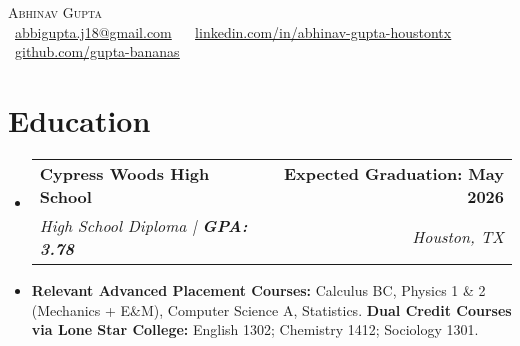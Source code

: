 \documentclass[letterpaper,11pt]{article}
\makeatletter
\newcommand{\resumeItem}[1]{
  \item\small{
    {#1 \vspace{0pt}}
  }
}
\newcommand{\resumeSubheading}[4]{
  \vspace{-2pt}\item
    \begin{tabular*}{1.0\textwidth}[t]{l@{\extracolsep{\fill}}r}
      \textbf{#1} & \textbf{\small #2} \\
      \textit{\small#3} & \textit{\small #4} \\
    \end{tabular*}\vspace{-7pt}
}
\newcommand{\resumeSubHeadingListStart}{\begin{itemize}[leftmargin=0.0in, label={}]}
\newcommand{\resumeSubHeadingListEnd}{\end{itemize}}\vspace{0pt}
\newcommand{\resumeItemListStart}{\begin{itemize}}
\newcommand{\resumeItemListEnd}{\end{itemize}\vspace{-5pt}}
\makeatother
\begin{document}
\begin{center}
        {\Large \scshape Abhinav Gupta} \\[2mm]
    \footnotesize \raisebox{-0.1\height}
    {\faEnvelope\  \underline{abbigupta.j18@gmail.com} ~}
    {\faLinkedin\ \underline{\href{www.linkedin.com/in/abhinav-gupta-houstontx}{linkedin.com/in/abhinav-gupta-houstontx}} }
    {\faGithub\ \underline{\href{www.github.com/gupta-bananas}{github.com/gupta-bananas}} ~}
    \vspace{-8pt}
\end{center}

\section{Education} 
  \resumeSubHeadingListStart
    \resumeSubheading
      {Cypress Woods High School}{Expected Graduation: May 2026}
      {High School Diploma  |\textbf{ GPA: 3.78}  
      }{Houston, TX}
  \resumeSubHeadingListEnd
    \resumeItemListStart
        \resumeItem {\textbf{Relevant Advanced Placement Courses:} Calculus BC, Physics 1 \& 2 (Mechanics + E\&M), Computer Science A, Statistics. \textbf{Dual Credit Courses via Lone Star College:} English 1302; Chemistry 1412; Sociology 1301.}

    \resumeItemListEnd
    \vspace{-10pt}
\end{document}
